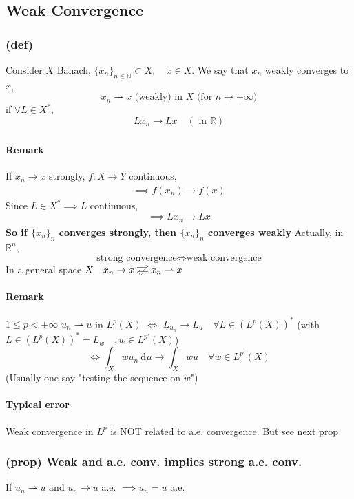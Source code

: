 \subsection{Weak Convergence}
\subsubsection{(def) }
Consider $X$ Banach,  $\{ x_n\}_{n\in \mathbb N}\subset X,\quad x\in X$.
We say that $x_n$ weakly converges to $x$,
$$x_n\rightharpoonup x\text{ (weakly) in }X \text{ (for }n\to+\infty)$$
if $\forall L\in X^*$,
$$Lx_n\xrightarrow[\quad]{}Lx\quad(\text{ in }\mathbb R)$$
\paragraph{Remark}
If $x_n\xrightarrow[\quad ]{}x$ strongly, $f:X\to Y$ continuous,
$$\implies f(x_n)\xrightarrow[\quad]{}f(x)$$
Since $L\in X^*\implies L$ continuous,
$$\implies Lx_n\xrightarrow[\quad]{}Lx$$
\textbf{So if $\{x_n\}_n$ converges strongly, then $\{x_n\}_n$ converges weakly}
Actually, in $\mathbb R^n$,
$$\text{strong convergence} \iff \text{weak convergence}$$
In a general space $X \quad x_n\to x \substack{\implies \\ \centernot\impliedby}x_n\rightharpoonup x$
\paragraph{Remark}
$1\leq p<+\infty$
$u_n\rightharpoonup u$ in $L^p(X)$ $\iff$ $L_{u_n}\to L_u\quad \forall L\in (L^p(X))^*$
(with $L\in (L^p(X))^* = L_w\quad ,w\in L^{p'}(X)$)
$$\iff\int_Xwu_n\ \mathrm d\mu\to \int_Xwu\quad \forall w\in L^{p'}(X)$$
(Usually one say "testing the sequence on $w$")
\paragraph{Typical error} Weak convergence in $L^p$ is NOT related to a.e. convergence. But see next prop
\subsubsection{(prop) Weak and a.e. conv. implies strong a.e. conv.}
If $u_n\rightharpoonup u$ and $u_n\to u$ a.e. $\implies u_n=u$ a.e.
